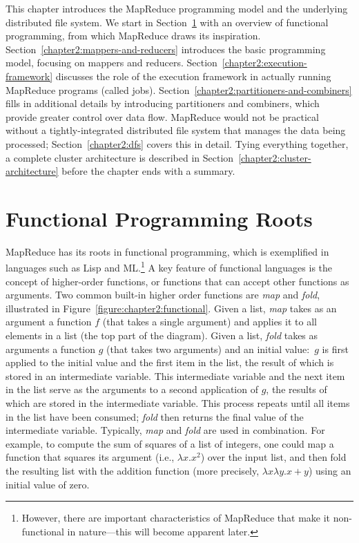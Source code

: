 This chapter introduces the MapReduce programming model and the
underlying distributed file system.  We start in
Section~\ref{chapter2:functional} with an overview of functional
programming, from which MapReduce draws its inspiration.
Section~\ref{chapter2:mappers-and-reducers} introduces the basic
programming model, focusing on mappers and reducers.
Section~\ref{chapter2:execution-framework} discusses the role of the
execution framework in actually running MapReduce programs (called
jobs).  Section~\ref{chapter2:partitioners-and-combiners} fills in
additional details by introducing partitioners and combiners, which
provide greater control over data flow.  MapReduce would not be
practical without a tightly-integrated distributed file system that
manages the data being processed; Section~\ref{chapter2:dfs} covers
this in detail.  Tying everything together, a complete cluster
architecture is described in
Section~\ref{chapter2:cluster-architecture} before the chapter ends
with a summary.

\section{Functional Programming Roots}
\label{chapter2:functional}

MapReduce has its roots in functional programming, which is
exemplified in languages such as Lisp and ML.\footnote{However, there
are important characteristics of MapReduce that make it non-functional
in nature---this will become apparent later.} A key feature of
functional languages is the concept of higher-order functions, or
functions that can accept other functions as arguments.  Two common
built-in higher order functions are {\it map} and {\it fold},
illustrated in Figure~\ref{figure:chapter2:functional}.  Given a list,
{\it map} takes as an argument a function $f$ (that takes a single
argument) and applies it to all elements in a list (the top part of
the diagram).  Given a list, {\it fold} takes as arguments a function
$g$ (that takes two arguments) and an initial value:\ $g$ is first
applied to the initial value and the first item in the list, the
result of which is stored in an intermediate variable.  This
intermediate variable and the next item in the list serve as the
arguments to a second application of $g$, the results of which are
stored in the intermediate variable.  This process repeats until all
items in the list have been consumed; {\it fold} then returns the
final value of the intermediate variable.  Typically, {\it map} and
{\it fold} are used in combination.  For example, to compute the sum
of squares of a list of integers, one could map a function that
squares its argument (i.e., $\lambda x. x^2$) over the input list, and
then fold the resulting list with the addition function (more
precisely, $\lambda x \lambda y. x + y$) using an initial value of
zero.


